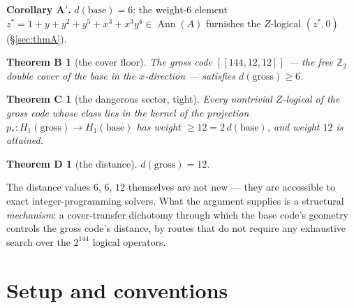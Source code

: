 \documentclass[11pt]{article}
\newcommand{\Z}{\mathbb{Z}}
\DeclareMathOperator{\Ann}{Ann}
\theoremstyle{plain}
\newtheorem*{thmB}{Theorem B}
\newtheorem*{thmC}{Theorem C}
\newtheorem*{thmD}{Theorem D}
\theoremstyle{definition}
\theoremstyle{remark}
\begin{document}
\noindent\textbf{Corollary A$'$.} $d(\mathrm{base})=6$: the weight-$6$ element
$z^\ast=1+y+y^2+y^5+x^3+x^3y^4\in\Ann(A)$ furnishes the $Z$-logical $(z^\ast,0)$
(\S\ref{sec:thmA}).

\begin{thmB}[the cover floor]
The gross code $[[144,12,12]]$ --- the free $\Z_2$ double cover of the base in the
$x$-direction --- satisfies $d(\mathrm{gross})\ge 6$.
\end{thmB}

\begin{thmC}[the dangerous sector, tight]
Every nontrivial $Z$-logical of the gross code whose class lies in the kernel of the
projection $p_\ast\colon H_1(\mathrm{gross})\to H_1(\mathrm{base})$ has weight
$\ge 12=2\,d(\mathrm{base})$, and weight $12$ is attained.
\end{thmC}

\begin{thmD}[the distance]
$d(\mathrm{gross})=12$.
\end{thmD}

The distance values $6$, $6$, $12$ themselves are not new --- they are accessible to
exact integer-programming solvers. What the argument supplies is a structural
\emph{mechanism}: a cover-transfer dichotomy through which the base code's geometry
controls the gross code's distance, by routes that do not require any exhaustive search
over the $2^{144}$ logical operators.

\section{Setup and conventions}\label{sec:setup}
\end{document}
